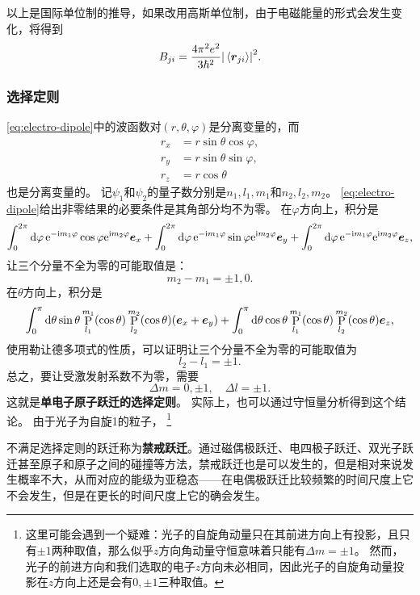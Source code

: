 \documentclass[UTF8, a4paper]{ctexart}
\newcommand*{\ee}{\mathrm{e}}
\newcommand*{\ii}{\mathrm{i}}
\DeclareMathOperator{\legpoly}{P}
\begin{document}
以上是国际单位制的推导，如果改用高斯单位制，由于电磁能量的形式会发生变化，将得到
\begin{equation}
    B_{ji} = \frac{4\pi^2 e^2}{3 \hbar^2} \abs{\expval*{\vb*{r}_{ji}}}^2.
\end{equation}

\subsubsection{选择定则}

\eqref{eq:electro-dipole}中的波函数对$(r, \theta, \varphi)$是分离变量的，而
\[
    \begin{aligned}
        r_x &= r \sin \theta \cos \varphi, \\
        r_y &= r \sin \theta \sin \varphi, \\
        r_z &= r \cos \theta 
    \end{aligned}
\]
也是分离变量的。
记$\psi_1$和$\psi_2$的量子数分别是$n_1, l_1, m_1$和$n_2, l_2, m_2$。
\eqref{eq:electro-dipole}给出非零结果的必要条件是其角部分均不为零。
在$\varphi$方向上，积分是
\[
    \int_0^{2\pi} \dd{\varphi} \ee^{ - \ii m_1 \varphi} \cos \varphi \ee^{\ii m_2 \varphi} \vb*{e}_x + \int_0^{2\pi} \dd{\varphi} \ee^{ - \ii m_1 \varphi} \sin \varphi \ee^{\ii m_2 \varphi} \vb*{e}_y + \int_0^{2\pi} \dd{\varphi} \ee^{ - \ii m_1 \varphi} \ee^{\ii m_2 \varphi} \vb*{e}_z,
\]
让三个分量不全为零的可能取值是：
\[
    m_2 - m_1 = \pm 1, 0.
\]
在$\theta$方向上，积分是
\[
    \int_0^\pi \dd{\theta} \sin \theta \legpoly_{l_1}^{m_1} (\cos \theta) \legpoly_{l_2}^{m_2} (\cos \theta) (\vb*{e}_x + \vb*{e}_y) + \int_0^\pi \dd{\theta} \cos \theta \legpoly_{l_1}^{m_1} (\cos \theta) \legpoly_{l_2}^{m_2} (\cos \theta) \vb*{e}_z,
\]
使用勒让德多项式的性质，可以证明让三个分量不全为零的可能取值为
\[
    l_2 - l_1 = \pm 1.
\]
总之，要让受激发射系数不为零，需要
\begin{equation}
    \Delta m = 0, \pm 1, \quad \Delta l = \pm 1.
\end{equation}
这就是\textbf{单电子原子跃迁的选择定则}。
实际上，也可以通过守恒量分析得到这个结论。
由于光子为自旋1的粒子，%
\footnote{这里可能会遇到一个疑难：光子的自旋角动量只在其前进方向上有投影，且只有$\pm 1$两种取值，那么似乎$z$方向角动量守恒意味着只能有$\Delta m = \pm 1$。
然而，光子的前进方向和我们选取的电子$z$方向未必相同，因此光子的自旋角动量投影在$z$方向上还是会有$0, \pm 1$三种取值。
}%


不满足选择定则的跃迁称为\textbf{禁戒跃迁}。通过磁偶极跃迁、电四极子跃迁、双光子跃迁甚至原子和原子之间的碰撞等方法，禁戒跃迁也是可以发生的，但是相对来说发生概率不大，从而对应的能级为亚稳态——在电偶极跃迁比较频繁的时间尺度上它不会发生，但是在更长的时间尺度上它的确会发生。
\end{document}
